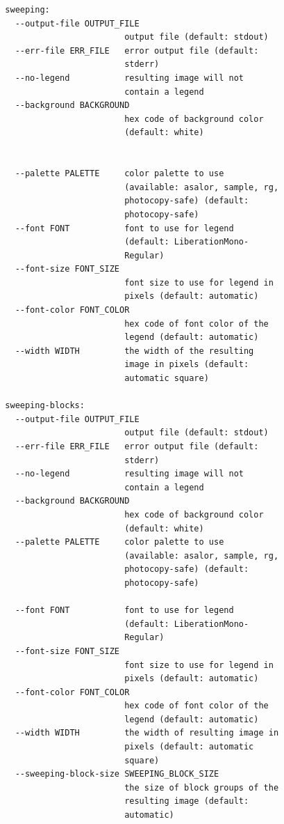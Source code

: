 \documentclass[
  digital, %
  color,   %
  oneside, %
  lof,     %
  nolot,     %
]{fithesis4}
\begin{document}
\begin{verbatim}
  sweeping:
    --output-file OUTPUT_FILE
                          output file (default: stdout)
    --err-file ERR_FILE   error output file (default:
                          stderr)
    --no-legend           resulting image will not
                          contain a legend
    --background BACKGROUND
                          hex code of background color
                          (default: white)
  

    --palette PALETTE     color palette to use
                          (available: asalor, sample, rg,
                          photocopy-safe) (default:
                          photocopy-safe)
    --font FONT           font to use for legend
                          (default: LiberationMono-
                          Regular)
    --font-size FONT_SIZE
                          font size to use for legend in
                          pixels (default: automatic)
    --font-color FONT_COLOR
                          hex code of font color of the
                          legend (default: automatic)
    --width WIDTH         the width of the resulting
                          image in pixels (default:
                          automatic square)

  sweeping-blocks:
    --output-file OUTPUT_FILE
                          output file (default: stdout)
    --err-file ERR_FILE   error output file (default:
                          stderr)
    --no-legend           resulting image will not
                          contain a legend
    --background BACKGROUND
                          hex code of background color
                          (default: white)
    --palette PALETTE     color palette to use
                          (available: asalor, sample, rg,
                          photocopy-safe) (default:
                          photocopy-safe)

    --font FONT           font to use for legend
                          (default: LiberationMono-
                          Regular)
    --font-size FONT_SIZE
                          font size to use for legend in
                          pixels (default: automatic)
    --font-color FONT_COLOR
                          hex code of font color of the
                          legend (default: automatic)
    --width WIDTH         the width of resulting image in
                          pixels (default: automatic
                          square)
    --sweeping-block-size SWEEPING_BLOCK_SIZE
                          the size of block groups of the
                          resulting image (default:
                          automatic)


\end{verbatim}
\end{document}
